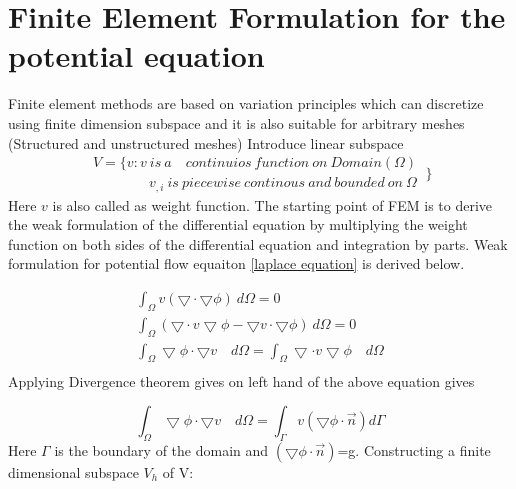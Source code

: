 \documentclass[12pt]{elsarticle}
\begin{document}
	\section{Finite Element Formulation for the potential equation}
	Finite element methods are based on variation principles which can discretize using finite dimension subspace and it is also suitable for arbitrary meshes (Structured and unstructured meshes)\newline
	\newline
	Introduce linear subspace
	\begin{equation}
		\begin{gathered}
			V=\{v:v\ is\ a\quad continuios\ function\ on\ Domain(\Omega)\\
			\quad \quad \quad \quad v_{,i}\ is\ piecewise\ continous\ and\ bounded\ on\ \Omega\
		\end{gathered}\}
	\end{equation}
	Here $v$ is also called as weight function. The starting point of FEM is to derive the weak formulation of the differential equation by multiplying the weight function on both sides of the differential equation and integration by parts. Weak formulation for potential flow equaiton \ref{laplace equation} is derived below.
	
	\begin{equation}
		\begin{gathered}
			\int_{\Omega} v (\bigtriangledown \cdot \bigtriangledown \phi)\ d \Omega=0\\
			\int_{\Omega} (\bigtriangledown \cdot v \bigtriangledown \phi-\bigtriangledown v \cdot \bigtriangledown\phi)\ d \Omega=0\\
			\int_{\Omega} \bigtriangledown \phi \cdot \bigtriangledown v \quad d \Omega =\int_{\Omega} \bigtriangledown \cdot v \bigtriangledown \phi \quad d \Omega\\
		\end{gathered}
	\end{equation} 
	Applying Divergence theorem gives on left hand of the above equation gives
	
	\begin{equation}
		\int_{\Omega} \bigtriangledown \phi \cdot \bigtriangledown v \quad d \Omega =\int_{\Gamma} v \left(\bigtriangledown \phi \cdot \overrightarrow{n}\right) d \Gamma
	\end{equation}
	Here $\Gamma$ is the boundary of the domain and $\left(\bigtriangledown \phi \cdot \overrightarrow{n}\right)$=g.\newline
	\newline
	Constructing a finite dimensional subspace $V_h$ of V:
	
\end{document}
